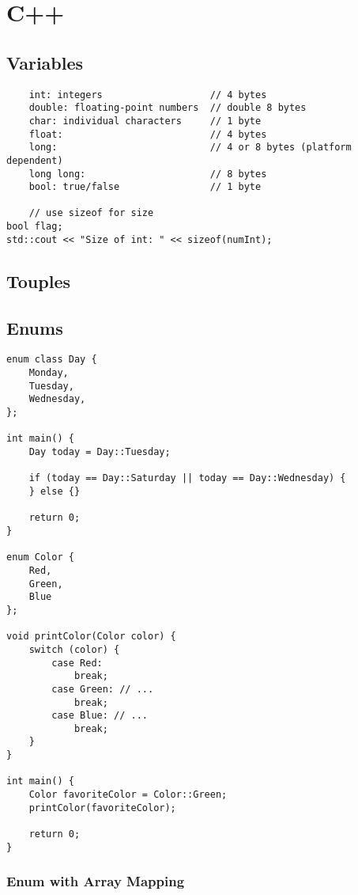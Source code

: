 \chapter{C++}

\section{Variables}

\begin{verbatim}
    int: integers                   // 4 bytes
    double: floating-point numbers  // double 8 bytes
    char: individual characters     // 1 byte
    float:                          // 4 bytes
    long:                           // 4 or 8 bytes (platform dependent)
    long long:                      // 8 bytes
    bool: true/false                // 1 byte

    // use sizeof for size
bool flag;
std::cout << "Size of int: " << sizeof(numInt); 

\end{verbatim}


\section{Touples}


\section{Enums}

\begin{verbatim}
enum class Day {
    Monday,
    Tuesday,
    Wednesday,
};

int main() {
    Day today = Day::Tuesday;

    if (today == Day::Saturday || today == Day::Wednesday) {
    } else {}

    return 0;
}

enum Color {
    Red,
    Green,
    Blue
};

void printColor(Color color) {
    switch (color) {
        case Red:
            break;
        case Green: // ...
            break;
        case Blue: // ...
            break;
    }
}

int main() {
    Color favoriteColor = Color::Green;
    printColor(favoriteColor);

    return 0;
}
\end{verbatim}

\subsection{Enum with Array Mapping}

